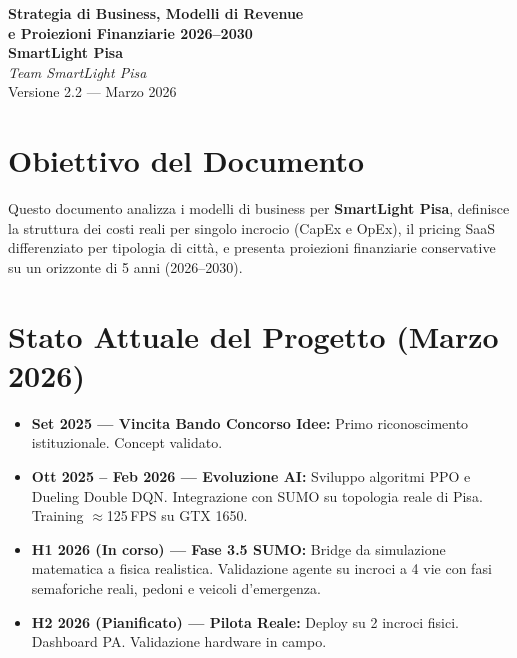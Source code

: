 \documentclass[a4paper,11pt]{article}
\begin{document}
\begin{center}
    \vspace*{1cm}
    {\Huge \bfseries \color{SmartBlue}
        Strategia di Business, Modelli di Revenue \\
        e Proiezioni Finanziarie 2026--2030} \\[0.5cm]
    {\Large \textbf{SmartLight Pisa}} \\[0.2cm]
    {\large \textit{Team SmartLight Pisa}} \\[0.2cm]
    {\small Versione 2.2 --- Marzo 2026}
    \vspace*{0.8cm}
\end{center}

\tableofcontents
\newpage

\section*{Obiettivo del Documento}
Questo documento analizza i modelli di business per \textbf{SmartLight Pisa},
definisce la struttura dei costi reali per singolo incrocio (CapEx e OpEx),
il pricing SaaS differenziato per tipologia di città, e presenta proiezioni
finanziarie conservative su un orizzonte di 5 anni (2026--2030).

\section{Stato Attuale del Progetto (Marzo 2026)}

\begin{tcolorbox}[
    enhanced, colback=SmartLight, colframe=SmartBlue,
    title=\textbf{Milestone Completate e In Corso}, boxrule=0.5mm
]
\begin{itemize}[nosep, topsep=4pt]
    \item \textbf{Set 2025 --- Vincita Bando Concorso Idee:} Primo riconoscimento istituzionale. Concept validato.
    \item \textbf{Ott 2025 -- Feb 2026 --- Evoluzione AI:} Sviluppo algoritmi PPO e Dueling Double DQN. Integrazione con SUMO su topologia reale di Pisa. Training $\approx$125\,FPS su GTX 1650.
    \item \textbf{H1 2026 (In corso) --- Fase 3.5 SUMO:} Bridge da simulazione matematica a fisica realistica. Validazione agente su incroci a 4 vie con fasi semaforiche reali, pedoni e veicoli d'emergenza.
    \item \textbf{H2 2026 (Pianificato) --- Pilota Reale:} Deploy su 2 incroci fisici. Dashboard PA. Validazione hardware in campo.
\end{itemize}
\end{tcolorbox}
\end{document}
